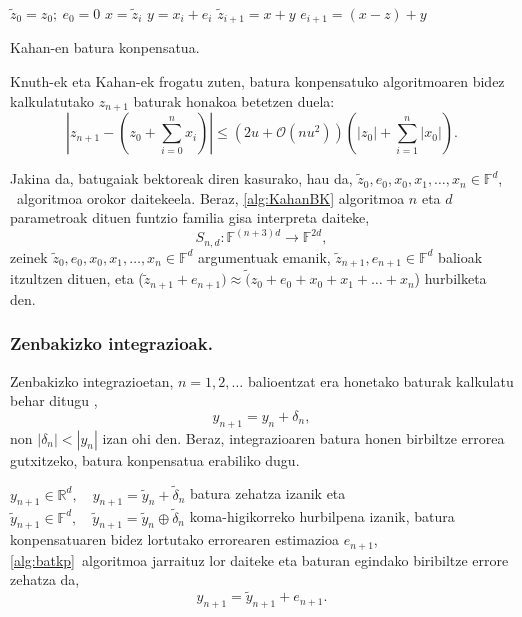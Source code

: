 \begin{algorithm}[H]
 \BlankLine
  $\tilde z_0= z_0; \ e_0=0$\;
  {
   \BlankLine
    $x=\tilde z_i$\;
    $y= x_i+e_i$\;
    $\tilde z_{i+1}=x+y$\;
    $e_{i+1}=(x-z)+y$\;
   \BlankLine
  }
 \caption{Kahan-en batura konpensatua.}
   \label{alg:KahanBK}
\end{algorithm}

Knuth-ek eta Kahan-ek \cite{Muller2009} frogatu zuten,  batura konpensatuko algoritmoaren bidez kalkulatutako $z_{n+1}$ baturak honakoa betetzen duela:
\begin{equation*}
\left | z_{n+1} - (z_0+\sum_{i=0}^{n} x_i) \right | \leq (2u+ \mathcal{O}(nu^2)) \left(|z_0|+\sum_{i=1}^{n} |x_0|\right).
\end{equation*}

Jakina da, batugaiak bektoreak diren kasurako, hau da, $\tilde z_0, e_0, x_0, x_1, \dots, x_n \in \mathbb{F}^d$, ~algoritmoa orokor daitekeela. Beraz, \ref{alg:KahanBK} algoritmoa $n$ eta $d$ parametroak dituen funtzio familia gisa interpreta daiteke,
\begin{equation}
\label{eq:batsd}
S_{n,d} : \mathbb{F}^{(n+3)d} \rightarrow \mathbb{F}^{2d},
\end{equation}
zeinek $\tilde z_0, e_0, x_0, x_1, \dots, x_n \in \mathbb{F}^d$ argumentuak emanik, $\tilde z_{n+1}, e_{n+1} \in \mathbb{F}^d$ balioak itzultzen dituen, eta ($\tilde z_{n+1}+e_{n+1}) \approx \tilde (z_0+e_0+x_0+x_1+ \dots+x_n$) hurbilketa den.

\subsubsection*{Zenbakizko integrazioak.}
 
Zenbakizko integrazioetan, $n=1,2,\dots$ balioentzat era honetako baturak kalkulatu behar ditugu \cite{Hairer2006},
\begin{equation*}
y_{n+1}=y_n+\delta_n,
\end{equation*}  
non $|\delta_n|<|y_n|$ izan ohi den. Beraz, integrazioaren batura honen birbiltze errorea gutxitzeko, batura konpensatua erabiliko dugu.  

$y_{n+1} \in \mathbb{R}^{d},\quad y_{n+1}=\tilde y_{n}+\tilde \delta_n$ batura zehatza izanik eta $\tilde y_{n+1} \in \mathbb{F}^{d}, \quad \tilde y_{n+1}=\tilde y_{n} \oplus \tilde \delta_n$ koma-higikorreko hurbilpena izanik, batura konpensatuaren bidez lortutako errorearen estimazioa $e_{n+1}$, \ref{alg:batkp}~algoritmoa jarraituz lor daiteke eta baturan egindako biribiltze errore zehatza da, 
\begin{equation}
y_{n+1}=\tilde {y}_{n+1}+e_{n+1}. 
\end{equation}

